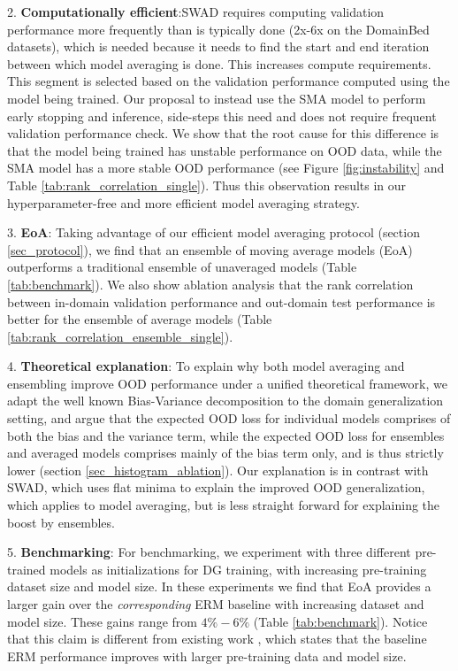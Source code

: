 \documentclass{article}
\begin{document}
2. \textbf{Computationally efficient}:SWAD requires computing validation performance more frequently than is typically done (2x-6x on the DomainBed datasets), which is needed because it needs to find the start and end iteration between which model averaging is done. This increases compute requirements. This segment is selected based on the validation performance computed using the model being trained. Our proposal to instead use the SMA model to perform early stopping and inference, side-steps this need and does not require frequent validation performance check. We show that the root cause for this difference is that the model being trained has unstable performance on OOD data, while the SMA model has a more stable OOD performance (see Figure \ref{fig:instability} and Table \ref{tab:rank_correlation_single}). Thus this observation results in our hyperparameter-free and more efficient model averaging strategy.

3.  \textbf{EoA}: Taking advantage of our efficient model averaging protocol (section \ref{sec_protocol}), we find that an ensemble of moving average models (EoA) outperforms a traditional ensemble of unaveraged models (Table \ref{tab:benchmark}). We also show ablation analysis that the rank correlation between in-domain validation performance and out-domain test performance is better for the ensemble of average models (Table \ref{tab:rank_correlation_ensemble_single}).

4. \textbf{Theoretical explanation}: To explain why both model averaging and ensembling improve OOD performance under a unified theoretical framework, we adapt the well known Bias-Variance decomposition to the domain generalization setting, and argue that the expected OOD loss for individual models comprises of both the bias and the variance term, while the expected OOD loss for ensembles and averaged models comprises mainly of the bias term only, and is thus strictly lower (section \ref{sec_histogram_ablation}). Our explanation is in contrast with SWAD, which uses flat minima to explain the improved OOD generalization, which applies to model averaging, but is less straight forward for explaining the boost by ensembles.

5. \textbf{Benchmarking}: For benchmarking, we experiment with three different pre-trained models as initializations for DG training, with increasing pre-training dataset size and model size. In these experiments we find that EoA provides a larger gain over the \textit{corresponding} ERM baseline with increasing dataset and model size. These gains range from $4\%-6\%$ (Table \ref{tab:benchmark}). Notice that this claim is different from existing work \cite{hendrycks2021many}, which states that the baseline ERM performance improves with larger pre-training data and model size.
\end{document}
